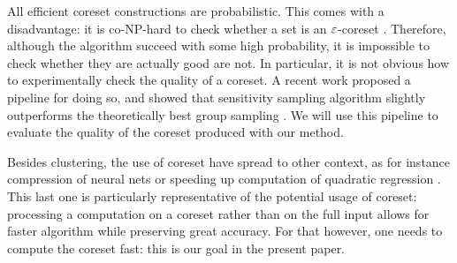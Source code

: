 All efficient coreset constructions are probabilistic. This comes with a disadvantage: it is co-NP-hard to check whether a set is an $\varepsilon$-coreset \cite{chrisESA}. Therefore, although the algorithm succeed with some high probability, it is impossible to check whether they are actually good are not. 
In particular, it is not obvious how to experimentally check the quality of a coreset.
A recent work proposed a pipeline for doing so, and showed that sensitivity sampling algorithm slightly outperforms the theoretically best group sampling \cite{chrisESA}. 
We will use this pipeline to evaluate the quality of the coreset produced with our method.

Besides clustering, the use of coreset have spread to other context, as for instance compression of neural nets \cite{BaykalLGFR19} or speeding up computation of quadratic regression \cite{MaaloufJF19}.
This last one is particularly representative of the potential usage of coreset: processing a computation on a coreset rather than on the full input allows for faster algorithm while preserving great accuracy.
For that however, one needs to compute the coreset fast: this is our goal in the present paper.
